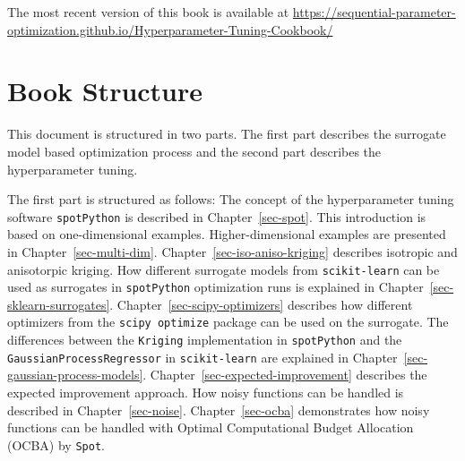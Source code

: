 \documentclass[
  letterpaper,
  DIV=11,
  numbers=noendperiod]{scrreprt}
\begin{document}
\begin{tcolorbox}[enhanced jigsaw, left=2mm, title=\textcolor{quarto-callout-important-color}{\faExclamation}\hspace{0.5em}{Important: This book is still under development.}, titlerule=0mm, toprule=.15mm, leftrule=.75mm, colbacktitle=quarto-callout-important-color!10!white, colback=white, arc=.35mm, toptitle=1mm, bottomtitle=1mm, colframe=quarto-callout-important-color-frame, bottomrule=.15mm, rightrule=.15mm, breakable, coltitle=black, opacitybacktitle=0.6, opacityback=0]

The most recent version of this book is available at
\url{https://sequential-parameter-optimization.github.io/Hyperparameter-Tuning-Cookbook/}

\end{tcolorbox}

\hypertarget{book-structure}{%
\section*{Book Structure}\label{book-structure}}


This document is structured in two parts. The first part describes the
surrogate model based optimization process and the second part describes
the hyperparameter tuning.

The first part is structured as follows: The concept of the
hyperparameter tuning software \texttt{spotPython} is described in
Chapter~\ref{sec-spot}. This introduction is based on one-dimensional
examples. Higher-dimensional examples are presented in
Chapter~\ref{sec-multi-dim}. Chapter~\ref{sec-iso-aniso-kriging}
describes isotropic and anisotorpic kriging. How different surrogate
models from \texttt{scikit-learn} can be used as surrogates in
\texttt{spotPython} optimization runs is explained in
Chapter~\ref{sec-sklearn-surrogates}. Chapter~\ref{sec-scipy-optimizers}
describes how different optimizers from the \texttt{scipy\ optimize}
package can be used on the surrogate. The differences between the
\texttt{Kriging} implementation in \texttt{spotPython} and the
\texttt{GaussianProcessRegressor} in \texttt{scikit-learn} are explained
in Chapter~\ref{sec-gaussian-process-models}.
Chapter~\ref{sec-expected-improvement} describes the expected
improvement approach. How noisy functions can be handled is described in
Chapter~\ref{sec-noise}. Chapter~\ref{sec-ocba} demonstrates how noisy
functions can be handled with Optimal Computational Budget Allocation
(OCBA) by \texttt{Spot}.
\end{document}

